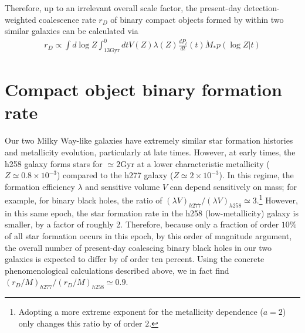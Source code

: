 \documentclass[nofootinbib,twocolumn,prd]{emulateapj}
\newcommand\editremark[1]{{\color{red}#1}}
\newcommand\unit[1]{\text{#1}}
\newcommand\ExcitingGalaxy{h258}
\newcommand\BoringGalaxy{h277}
\begin{document}
Therefore, up to an irrelevant overall scale factor, the  present-day detection-weighted coalescence rate $r_D$  of binary compact objects formed by within two similar
galaxies  can be calculated via
\begin{eqnarray}\label{eqn:rate}
 r_D \propto  \int d\log Z  \int _{13 \unit{Gyr}}^0dt  V(Z) \lambda(Z) \frac{dP_t}{dt}(t) \dot{M}_* p(\log Z|t)
\end{eqnarray}


\section{Compact object binary formation rate}
\label{sec:results:BBH}


 Our two Milky Way-like galaxies have extremely similar star formation histories and metallicity evolution, particularly at late
 times.  
However, at early times, the \ExcitingGalaxy{} galaxy forms stars for $\simeq 2\unit{Gyr}$ at a lower characteristic metallicity
($Z\simeq 0.8 \times10^{-3}$) compared
to the \BoringGalaxy{} galaxy ($Z\simeq 2\times 10^{-3}$).  In this regime, the formation efficiency $\lambda$ and sensitive volume $V$
can depend sensitively on mass; for example, for binary black holes, the ratio of  $(\lambda V)_{\BoringGalaxy{}}/(\lambda
V)_{\ExcitingGalaxy{}} \simeq 3$.\footnote{Adopting a more extreme exponent for the metallicity dependence ($a=2$) only
  changes this ratio by of order $2$.}   However, in this same epoch, the star formation rate in the \ExcitingGalaxy{} (low-metallicity)
galaxy is smaller, by a factor of roughly 2.
Therefore, because only a fraction of order $10\%$  of all star formation occurs in this epoch, by this order of magnitude
argument, the overall number of
present-day coalescing binary black holes in our two galaxies is expected to differ by of order ten percent.
%
Using the concrete phenomenological calculations described above, we in fact find
$(r_{D}/M)_{\BoringGalaxy{}}/(r_{D}/M)_{\ExcitingGalaxy{}}\simeq 0.9$.    
\end{document}
